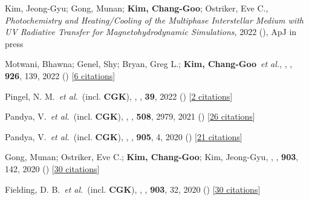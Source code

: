 \item[{32.}]Kim, Jeong-Gyu; Gong, Munan; \textbf{Kim, Chang-Goo}; Ostriker, Eve C., \textit{Photochemistry and Heating/Cooling of the Multiphase Interstellar Medium with UV Radiative Transfer for Magnetohydrodynamic Simulations}, 2022 (), ApJ in press

\item[{33.}]Motwani, Bhawna; Genel, Shy; Bryan, Greg L.; \textbf{Kim, Chang-Goo}~\textit{et al.}, , \apj, \textbf{926}, 139, 2022 () [\href{http://adsabs.harvard.edu/abs/2022ApJ...926..139M}{6 citations}]

\item[{34.}]Pingel, N. M.~\textit{et al.}~(incl. \textbf{CGK}), , \pasa, \textbf{39}, 2022 () [\href{http://adsabs.harvard.edu/abs/2022PASA...39....5P}{2 citations}]

\item[{35.}]Pandya, V.~\textit{et al.}~(incl. \textbf{CGK}), , \mnras, \textbf{508}, 2979, 2021 () [\href{http://adsabs.harvard.edu/abs/2021MNRAS.508.2979P}{26 citations}]

\item[{36.}]Pandya, V.~\textit{et al.}~(incl. \textbf{CGK}), , \apj, \textbf{905}, 4, 2020 () [\href{http://adsabs.harvard.edu/abs/2020ApJ...905....4P}{21 citations}]

\item[{37.}]Gong, Munan; Ostriker, Eve C.; \textbf{Kim, Chang-Goo}; Kim, Jeong-Gyu, , \apj, \textbf{903}, 142, 2020 () [\href{http://adsabs.harvard.edu/abs/2020ApJ...903..142G}{30 citations}]

\item[{38.}]Fielding, D. B.~\textit{et al.}~(incl. \textbf{CGK}), , \apj, \textbf{903}, 32, 2020 () [\href{http://adsabs.harvard.edu/abs/2020ApJ...903...32F}{30 citations}]

